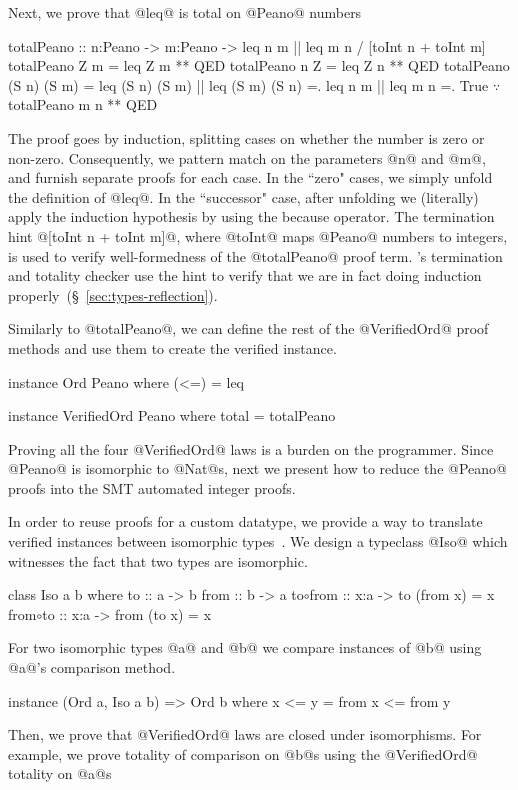 Next, we prove that @leq@ is total on @Peano@ numbers
%
\begin{mcode}
  totalPeano
   :: n:Peano -> m:Peano -> {leq n m || leq m n}
   /  [toInt n + toInt m]
  totalPeano Z m = leq Z m ** QED
  totalPeano n Z = leq Z n ** QED
  totalPeano (S n) (S m)
   =  leq (S n) (S m) || leq (S m) (S n)
   =. leq n m || leq m n
   =. True $\because$ totalPeano m n
   ** QED
\end{mcode}
The proof goes by induction, splitting cases on
whether the number is zero or non-zero. Consequently,
we pattern match on the parameters @n@ and @m@, and furnish
separate proofs for each case.
%
In the ``zero" cases, we simply unfold the definition
of @leq@.
%
In the ``successor" case, after unfolding we (literally)
apply the induction hypothesis by using the because operator.
%
The termination hint @[toInt n + toInt m]@,
where @toInt@ maps @Peano@ numbers to integers,
is used to verify well-formedness of the @totalPeano@
proof term.
%
\toolname's termination and totality checker
use the hint to
verify that we are in fact doing induction
properly~(\S~\ref{sec:types-reflection}).

Similarly to @totalPeano@, we can define the rest of the @VerifiedOrd@
proof methods and use them to create the verified instance.
%
\begin{code}
  instance Ord Peano where
    (<=) = leq

  instance VerifiedOrd Peano where
    total = totalPeano
\end{code}
%
Proving all the four @VerifiedOrd@ laws
is a burden on the programmer.
%
Since @Peano@ is isomorphic to @Nat@s,
next we present how
to reduce the @Peano@ proofs into the
SMT automated integer proofs.

%
In order to reuse proofs for a custom datatype,
we provide a way to translate verified instances between isomorphic types~\cite{barthe2001type}.
%
We design a typeclass @Iso@ which witnesses the fact that
two types are isomorphic.

\begin{mcode}
  class Iso a b where
    to      :: a -> b
    from    :: b -> a
    to$\circ$from :: x:a -> {to (from x) = x}
    from$\circ$to :: x:a -> {from (to x) = x}
\end{mcode}
%
For two isomorphic types @a@ and @b@
we compare instances of @b@ using @a@'s
comparison method.
%
\begin{mcode}
  instance (Ord a, Iso a b) => Ord b where
    x <= y = from x <= from y
\end{mcode}
%
Then, we prove that @VerifiedOrd@ laws are closed under isomorphisms.
%
For example, we prove totality of comparison on @b@s
using the @VerifiedOrd@ totality on @a@s

